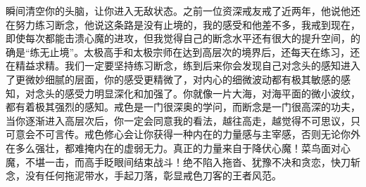 \begin{case}
瞬间清空你的头脑，让你进入无敌状态。之前一位资深戒友戒了近两年，他说他还在努力练习断念，他说这条路是没有止境的，我的感受和他差不多，我戒到现在，即使每次都能击溃心魔的进攻，但我觉得自己的断念水平还有很大的提升空间，的确是“练无止境”。太极高手和太极宗师在达到高层次的境界后，还每天在练习，还在精益求精。我们一定要坚持练习断念，练到后来你会发现自己对念头的感知进入了更微妙细腻的层面，你的感受更精微了，对内心的细微波动都有极其敏感的感知，对念头的感受力明显深化和加强了。你就像一片大海，对海平面的微小波纹，都有着极其强烈的感知。戒色是一门很深奥的学问，而断念是一门很高深的功夫，当你逐渐进入高层次后，你一定会同意我的看法，越往高走，越觉得不可思议，只可意会不可言传。戒色修心会让你获得一种内在的力量感与主宰感，否则无论你外在多么强壮，都难掩内在的虚弱无力。真正的力量来自于降伏心魔！菜鸟面对心魔，不堪一击，而高手眨眼间结束战斗！绝不陷入拖沓、犹豫不决和贪恋，快刀斩念，没有任何拖泥带水，手起刀落，彰显戒色刀客的王者风范。
\end{case}

